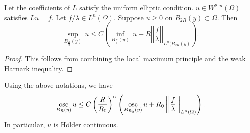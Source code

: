 \begin{theorem} Let the coefficients of $L$ satisfy the uniform elliptic condition. $u\in W^{2,n}(\Omega)$ satisfies $Lu=f$. Let $f/\lambda\in L^n(\Omega)$. Suppose $u\geq 0$ on $B_{2R}(y)\subset\Omega$. Then
\[
\sup_{B_{\frac R2}(y)}\, u\leq C\left(\inf_{B_{\frac R2}(y)}\, u+R\left|\left|\frac f\lambda\right|\right|_{L^n(B_{2R}(y)}\right).
\]
\end{theorem}

\begin{proof}
This follows from combining the local maximum principle and the weak Harnark inequality. 
\end{proof}

\begin{theorem} Using the above notations, we have
\[
\underset{B_R(y)}{{\rm osc}}\, u\leq C\left(\frac{R}{R_0}\right)^\alpha\left(\underset{B_{R_0}(y)}{{\rm osc}}\, u
+R_0\left|\left|\frac f\lambda\right|\right|_{L^n(\Omega)}\right).
\]
In particular, $u$ is  H\"older continuous.
\end{theorem}
